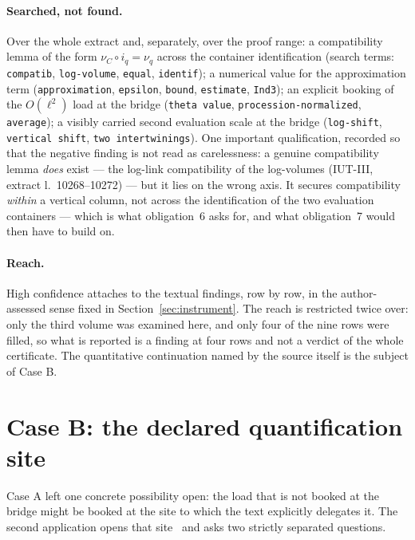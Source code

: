\documentclass[11pt,a4paper]{article}
\theoremstyle{definition}
\newcommand{\anchor}[2]{(#1, extract l.~#2)}
\begin{document}
\paragraph{Searched, not found.} Over the whole extract and, separately, over the
proof range: a compatibility lemma of the form $\nu_C \circ i_q = \nu_q$ across
the container identification (search terms: \texttt{compatib}, \texttt{log-volume},
\texttt{equal}, \texttt{identif}); a numerical value for the approximation term
(\texttt{approximation}, \texttt{epsilon}, \texttt{bound}, \texttt{estimate},
\texttt{Ind3}); an explicit booking of the $O(\ell^2)$ load at the bridge
(\texttt{theta value}, \texttt{procession-normalized}, \texttt{average}); a
visibly carried second evaluation scale at the bridge (\texttt{log-shift},
\texttt{vertical shift}, \texttt{two intertwinings}). One important qualification,
recorded so that the negative finding is not read as carelessness: a genuine
compatibility lemma \emph{does} exist --- the log-link compatibility of the
log-volumes \anchor{IUT-III}{10268--10272} --- but it lies on the wrong axis. It
secures compatibility \emph{within} a vertical column, not across the
identification of the two evaluation containers --- which is what obligation~6
asks for, and what obligation~7 would then have to build on.

\paragraph{Reach.} High confidence attaches to the textual findings, row by row, in
the author-assessed sense fixed in Section~\ref{sec:instrument}. The reach is
restricted twice over: only the third volume was examined here, and only four of
the nine rows were filled, so what is reported is a finding at four rows and not a
verdict of the whole certificate. The quantitative continuation named by the source
itself is the subject of Case B.

\section{Case B: the declared quantification site}
\label{sec:caseB}

Case A left one concrete possibility open: the load that is not booked at the
bridge might be booked at the site to which the text explicitly delegates it. The
second application opens that site~\cite{Mochizuki2021d} and asks two strictly
separated questions.
\end{document}
